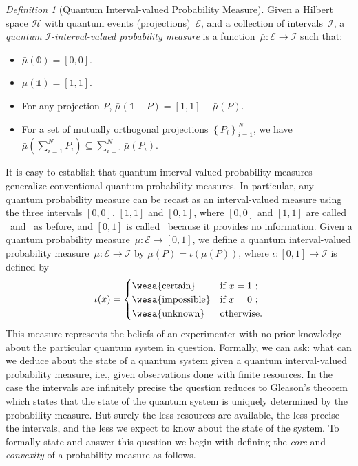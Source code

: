 \documentclass{article}
\theoremstyle{remark}
\newtheorem{definition}{Definition}
\newcommand{\Hilb}{\mathcal{H}}
\newcommand{\events}{\ensuremath{\mathcal{E}}}
\newcommand{\imposs}{{\mbox{\wesa{impossible}}}}
\newcommand{\necess}{{\mbox{\wesa{certain}}}}
\newcommand{\unknown}{{\mbox{\wesa{unknown}}}}
\begin{document}
\begin{definition}[Quantum Interval-valued Probability Measure]\label{def:QuantumInterval-valuedProbability}
  Given a Hilbert space $\Hilb$ with quantum events
  (projections)~$\events$, and a collection of
  intervals~$\mathscr{I}$, a \emph{quantum
    $\mathscr{I}$-interval-valued probability measure} is a
  function~$\bar{\mu}:\events\rightarrow\mathscr{I}$ such that:
\begin{itemize}
\item $\bar{\mu}(\mathbb{0})=\left[0,0\right]$. 
\item $\bar{\mu}(\mathbb{1})=\left[1,1\right]$. 
\item For any projection $P$,
  $\bar{\mu}\left(\mathbb{1}-P\right)=\left[1,1\right]-\bar{\mu}\left(P\right)$.
\item For a set of mutually orthogonal projections
  $\left\{ P_{i}\right\} _{i=1}^{N}$, we have
  $\bar{\mu}\left(\sum_{i=1}^{N}
    P_{i}\right)\subseteq\sum_{i=1}^{N}\bar{\mu}\left(P_{i}\right)$.
\end{itemize}
\end{definition}

\noindent It is easy to establish that quantum interval-valued
probability measures generalize conventional quantum probability
measures. In particular, any quantum probability measure can be recast
as an interval-valued measure using the three intervals
$\left[0,0\right]$, $\left[1,1\right]$ and \emph{$\left[0,1\right]$},
where $\left[0,0\right]$ and $\left[1,1\right]$ are called \imposs~and
\necess~as before, and \emph{$\left[0,1\right]$} is called
\unknown~because it provides no information. Given a quantum
probability measure~$\mu:\events\rightarrow\left[0,1\right]$, we
define a quantum interval-valued probability
measure~$\bar{\mu}:\events\rightarrow\mathscr{I}$ by
$\bar{\mu}(P)=\iota\left(\mu(P)\right)$, where
$\iota:\left[0,1\right]\rightarrow\mathscr{I}$ is defined by
\[
\iota(x)=\begin{cases}
\necess & \textrm{if }x=1\textrm{ ;}\\
\imposs & \textrm{if }x=0\textrm{ ;}\\
\unknown & \textrm{otherwise.}
\end{cases}
\]
This measure represents the beliefs of an experimenter with no prior 
knowledge about the particular quantum system in question. Formally,
we can ask: what can we deduce about the state of a quantum system
given a quantum interval-valued probability measure, i.e., given
observations done with finite resources. In the case the intervals are
infinitely precise the question reduces to Gleason's theorem which
states that the state of the quantum system is uniquely determined by
the probability measure. But surely the less resources are available,
the less precise the intervals, and the less we expect to know about
the state of the system. To formally state and answer this question we
begin with defining the \emph{core} and \emph{convexity} of a
probability measure as follows.
\end{document}
